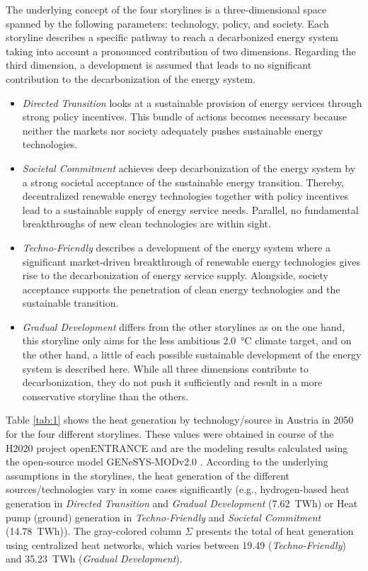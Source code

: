 The underlying concept of the four storylines is a three-dimensional space spanned by the following parameters: technology, policy, and society. Each storyline describes a specific pathway to reach a decarbonized energy system taking into account a pronounced contribution of two dimensions. Regarding the third dimension, a development is assumed that leads to no significant contribution to the decarbonization of the energy system. 

\begin{itemize}
	\item \textit{Directed Transition} looks at a sustainable provision of energy services through strong policy incentives. This bundle of actions becomes necessary because neither the markets nor society adequately pushes sustainable energy technologies.
	\item \textit{Societal Commitment} achieves deep decarbonization of the energy system by a strong societal acceptance of the sustainable energy transition. Thereby, decentralized renewable energy technologies together with policy incentives lead to a sustainable supply of energy service needs. Parallel, no fundamental breakthroughs of new clean technologies are within sight.
	\item \textit{Techno-Friendly} describes a development of the energy system where a significant market-driven breakthrough of renewable energy technologies gives rise to the decarbonization of energy service supply. Alongside, society acceptance supports the penetration of clean energy technologies and the sustainable transition.
	\item \textit{Gradual Development} differs from the other storylines as on the one hand, this storyline only aims for the less ambitious \SI{2.0}{\degreeCelsius} climate target, and on the other hand, a little of each possible sustainable development of the energy system is described here. While all three dimensions contribute to decarbonization, they do not push it sufficiently and result in a more conservative storyline than the others.
\end{itemize}

Table \ref{tab:1} shows the heat generation by technology/source in Austria in 2050 for the four different storylines. These values were obtained in course of the H2020 project openENTRANCE and are the modeling results calculated using the open-source model GENeSYS-MODv2.0 \cite{burandt2018genesys}. According to the underlying assumptions in the storylines, the heat generation of the different sources/technologies vary in some cases significantly (e.g., hydrogen-based heat generation in \textit{Directed Transition} and \textit{Gradual Development} (\SI{7.62}{TWh}) or Heat pump (ground) generation in \textit{Techno-Friendly} and \textit{Societal Commitment} (\SI{14.78}{TWh})). The gray-colored column $\Sigma$ presents the total of heat generation using centralized heat networks, which varies between \SI{19.49}{} (\textit{Techno-Friendly}) and \SI{35.23}{TWh} (\textit{Gradual Development}).

